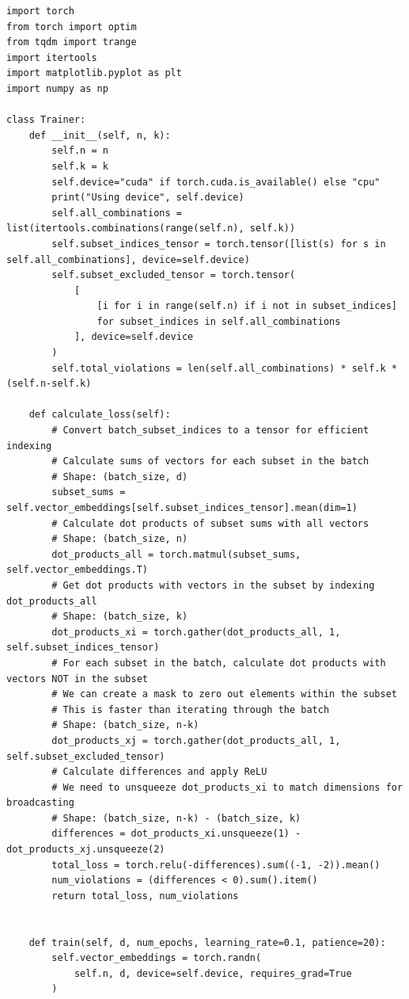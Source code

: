 \begin{lstlisting}
import torch
from torch import optim
from tqdm import trange
import itertools
import matplotlib.pyplot as plt
import numpy as np

class Trainer:
    def __init__(self, n, k):
        self.n = n
        self.k = k
        self.device="cuda" if torch.cuda.is_available() else "cpu"
        print("Using device", self.device)
        self.all_combinations = list(itertools.combinations(range(self.n), self.k))
        self.subset_indices_tensor = torch.tensor([list(s) for s in self.all_combinations], device=self.device)
        self.subset_excluded_tensor = torch.tensor(
            [
                [i for i in range(self.n) if i not in subset_indices]
                for subset_indices in self.all_combinations
            ], device=self.device
        )
        self.total_violations = len(self.all_combinations) * self.k * (self.n-self.k)

    def calculate_loss(self):
        # Convert batch_subset_indices to a tensor for efficient indexing
        # Calculate sums of vectors for each subset in the batch
        # Shape: (batch_size, d)
        subset_sums = self.vector_embeddings[self.subset_indices_tensor].mean(dim=1)
        # Calculate dot products of subset sums with all vectors
        # Shape: (batch_size, n)
        dot_products_all = torch.matmul(subset_sums, self.vector_embeddings.T)
        # Get dot products with vectors in the subset by indexing dot_products_all
        # Shape: (batch_size, k)
        dot_products_xi = torch.gather(dot_products_all, 1, self.subset_indices_tensor)
        # For each subset in the batch, calculate dot products with vectors NOT in the subset
        # We can create a mask to zero out elements within the subset
        # This is faster than iterating through the batch
        # Shape: (batch_size, n-k)
        dot_products_xj = torch.gather(dot_products_all, 1, self.subset_excluded_tensor)
        # Calculate differences and apply ReLU
        # We need to unsqueeze dot_products_xi to match dimensions for broadcasting
        # Shape: (batch_size, n-k) - (batch_size, k)
        differences = dot_products_xi.unsqueeze(1) - dot_products_xj.unsqueeze(2)
        total_loss = torch.relu(-differences).sum((-1, -2)).mean()
        num_violations = (differences < 0).sum().item()
        return total_loss, num_violations


    def train(self, d, num_epochs, learning_rate=0.1, patience=20):
        self.vector_embeddings = torch.randn(
            self.n, d, device=self.device, requires_grad=True
        )



\end{lstlisting}
